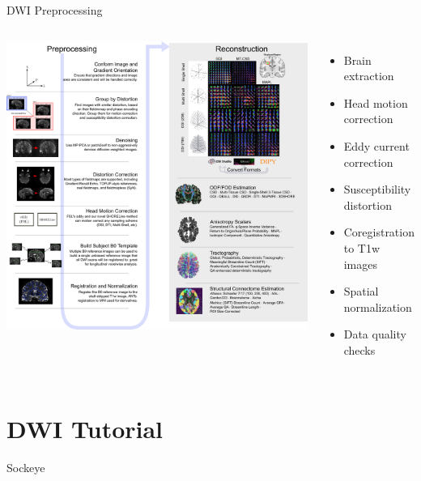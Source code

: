 \documentclass[aspectratio=169,xcolor=dvipsnames]{beamer}
\begin{document}
\begin{frame}{DWI Preprocessing}
\begin{columns}
\includegraphics[width=1\textwidth]{imgs/qsiprep_workflow_full}

\begin{itemize}
\item Brain extraction
\item Head motion correction
\item Eddy current correction
\item Susceptibility distortion
\item Coregistration to T1w images
\item Spatial normalization
\item Data quality checks

\end{itemize}
\end{columns}

\end{frame}

\section{DWI Tutorial}

\begin{frame}{Sockeye}

\end{frame}
\end{document}
